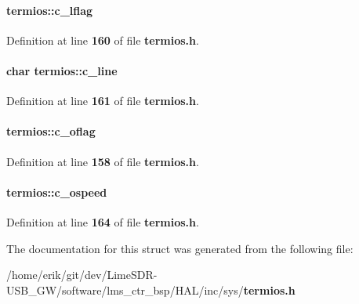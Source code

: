 \paragraph[{c\+\_\+lflag}]{ termios\+::c\+\_\+lflag}\label{structtermios_a91bdd7691180800fccc4b791466ee9c3}


Definition at line {\bf 160} of file {\bf termios.\+h}.

\paragraph[{c\+\_\+line}]{\setlength{\rightskip}{0pt plus 5cm}char termios\+::c\+\_\+line}\label{structtermios_a31df62c16fcae0dc2de988d558fcbf45}


Definition at line {\bf 161} of file {\bf termios.\+h}.

\paragraph[{c\+\_\+oflag}]{ termios\+::c\+\_\+oflag}\label{structtermios_ad6e2cfedb81530e5a6a3a0e30b8c6362}


Definition at line {\bf 158} of file {\bf termios.\+h}.

\paragraph[{c\+\_\+ospeed}]{ termios\+::c\+\_\+ospeed}\label{structtermios_a3f42b69c0c7fa4ce2179cb61f8c7ca99}


Definition at line {\bf 164} of file {\bf termios.\+h}.



The documentation for this struct was generated from the following file\+:\begin{DoxyCompactItemize}
\item 
/home/erik/git/dev/\+Lime\+S\+D\+R-\/\+U\+S\+B\+\_\+\+G\+W/software/lms\+\_\+ctr\+\_\+bsp/\+H\+A\+L/inc/sys/{\bf termios.\+h}\end{DoxyCompactItemize}
